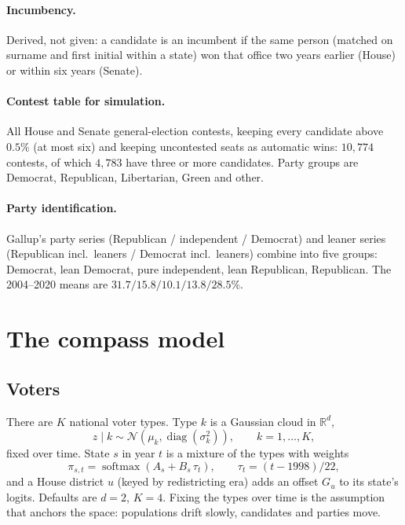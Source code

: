 \documentclass[11pt]{article}
\newcommand{\R}{\mathbb{R}}
\begin{document}
\paragraph{Incumbency.} Derived, not given: a candidate is an incumbent if the same person (matched on surname and first initial within a state) won that office two years earlier (House) or within six years (Senate).

\paragraph{Contest table for simulation.} All House and Senate general-election contests, keeping every candidate above $0.5\%$ (at most six) and keeping uncontested seats as automatic wins: $10{,}774$ contests, of which $4{,}783$ have three or more candidates. Party groups are Democrat, Republican, Libertarian, Green and other.

\paragraph{Party identification.} Gallup's party series (Republican / independent / Democrat) and leaner series (Republican incl.\ leaners / Democrat incl.\ leaners) combine into five groups: Democrat, lean Democrat, pure independent, lean Republican, Republican. The 2004--2020 means are $31.7 / 15.8 / 10.1 / 13.8 / 28.5\%$.

\section{The compass model}
\label{sec:model}

\FloatBarrier
\subsection{Voters}
There are $K$ national voter types. Type $k$ is a Gaussian cloud in $\R^d$,
\begin{equation}
z \mid k \sim \mathcal N\!\left(\mu_k, \operatorname{diag}(\sigma_k^2)\right), \qquad k=1,\dots,K ,
\end{equation}
fixed over time. State $s$ in year $t$ is a mixture of the types with weights
\begin{equation}
\pi_{s,t} = \operatorname{softmax}\!\left(A_s + B_s\,\tau_t\right), \qquad \tau_t = (t-1998)/22 ,
\end{equation}
and a House district $u$ (keyed by redistricting era) adds an offset $G_u$ to its state's logits. Defaults are $d=2$, $K=4$. Fixing the types over time is the assumption that anchors the space: populations drift slowly, candidates and parties move.
\end{document}
